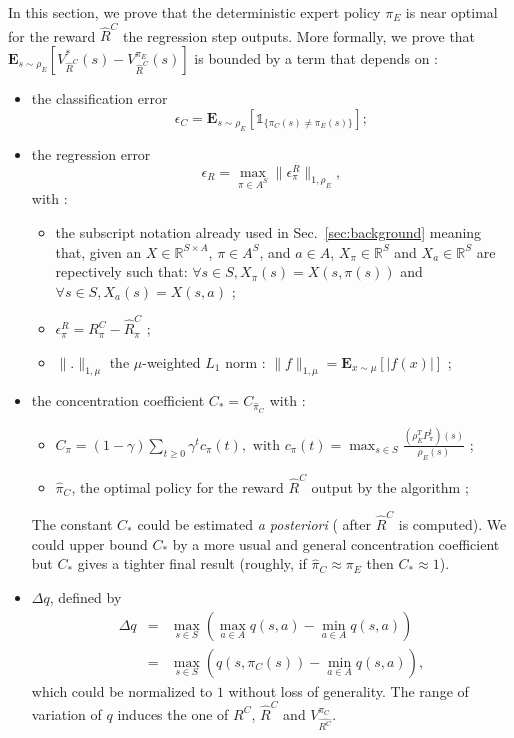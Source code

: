 \documentclass[smallextended]{svjour3}
\newcommand{\E}{\mathbf{E}}
\begin{document}
In this section, we prove that the deterministic expert policy $\pi_E$ is near optimal for the reward $\hat{R}^C$ the regression step outputs.
More formally, we prove that $\E_{s\sim\rho_E}[V^*_{\hat{R}^C}(s)-V^{\pi_E}_{\hat{R}^C}(s)]$ is bounded by a term that depends on :
\begin{itemize}
  \item the classification error
\begin{equation}  
\epsilon_C=\E_{s\sim\rho_E}[\mathds{1}_{\{\pi_C(s)\neq\pi_E(s)\}}];
\end{equation}
\item the regression error
  \begin{equation}
    \epsilon_R=\max_{\pi\in A^S}\|\epsilon_\pi^R\|_{1,\rho_E},
  \end{equation}
  with :
  \begin{itemize}
  \item the subscript notation already used in Sec.~\ref{sec:background} meaning that, given an $X\in\mathbb{R}^{S\times A}$, $\pi\in A^S$, and $a\in A$,  $X_\pi\in\mathbb{R}^S$ and $X_a\in\mathbb{R}^S$ are repectively such that: $\forall s\in S, X_\pi(s)=X(s,\pi(s))$ and $\forall s\in S, X_a(s)=X(s,a)$ ;
  \item $\epsilon^R_\pi=R^C_\pi-\hat{R}^C_\pi$ ;
  \item $\|.\|_{1,\mu}$ the $\mu$-weighted $L_1$ norm : $\|f\|_{1,\mu} = \E_{x\sim \mu}[|f(x)|]$ ;
  \end{itemize}
\item the concentration coefficient $C_* = C_{\hat \pi_C}$ with :
  \begin{itemize}
  \item $C_{\pi}=(1-\gamma)\sum_{t\geq0}\gamma^tc_{\pi}(t), \text{ with } c_{\pi}(t)=\max_{s\in S}\frac{(\rho_E^TP^t_\pi)(s)}{\rho_E(s)}$ ;
  \item $\hat \pi_C$, the optimal policy for the reward $\hat R^C$ output by the algorithm ;
  \end{itemize}
  The constant $C_*$ could be estimated \emph{a posteriori} ( after $\hat{R}^C$ is computed). We could upper bound $C_*$ by a more usual and general concentration coefficient but $C_*$ gives a tighter final result (roughly, if $\hat{\pi}_C\approx\pi_E$ then $C_* \approx 1$).
\item $\Delta q$, defined by 
  \begin{eqnarray}
    \Delta q &= &\max_{s\in S}(\max_{a\in A}q(s,a)-\min_{a\in A}q(s,a))\\
    &=&\max_{s\in S}(q(s,\pi_C(s))-\min_{a\in A}q(s,a)),
    \end{eqnarray} which could be normalized to $1$ without loss of generality. The range of variation of $q$ induces the one of $R^C$, $\hat{R}^C$ and $V^{\pi_C}_{\hat{R^C}}$.
  \end{itemize}
\end{document}
